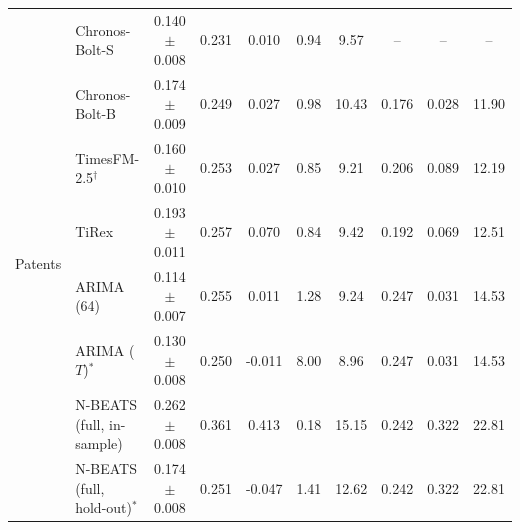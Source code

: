 \begin{tabular}{llcccccccc}
\midrule
\multirow{8}{*}{Patents} & Chronos-Bolt-S & 0.140$\pm$0.008 & 0.231 & 0.010 & 0.94 & 9.57 & -- & -- & -- \\
 & Chronos-Bolt-B & 0.174$\pm$0.009 & 0.249 & 0.027 & 0.98 & 10.43 & 0.176 & 0.028 & 11.90 \\
 & TimesFM-2.5$^\dagger$ & 0.160$\pm$0.010 & 0.253 & 0.027 & 0.85 & 9.21 & 0.206 & 0.089 & 12.19 \\
 & TiRex & 0.193$\pm$0.011 & 0.257 & 0.070 & 0.84 & 9.42 & 0.192 & 0.069 & 12.51 \\
 & ARIMA (64) & 0.114$\pm$0.007 & 0.255 & 0.011 & 1.28 & 9.24 & 0.247 & 0.031 & 14.53 \\
 & ARIMA ($T$)$^\ast$ & 0.130$\pm$0.008 & 0.250 & -0.011 & 8.00 & 8.96 & 0.247 & 0.031 & 14.53 \\
 & N-BEATS (full, in-sample) & 0.262$\pm$0.008 & 0.361 & 0.413 & 0.18 & 15.15 & 0.242 & 0.322 & 22.81 \\
 & N-BEATS (full, hold-out)$^\ast$ & 0.174$\pm$0.008 & 0.251 & -0.047 & 1.41 & 12.62 & 0.242 & 0.322 & 22.81 \\
\bottomrule
\end{tabular}
